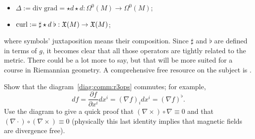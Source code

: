 \begin{example}
\begin{itemize}
		\item $\Delta := \mathrm{div}\; \mathrm{grad} = \star d \star d : \Omega^0(M) \to \Omega^0(M)$;
		\item $\mathrm{curl} := \sharp \star d\; \flat : \mathfrak{X}(M) \to \mathfrak{X}(M)$;
	\end{itemize}
	where symbols' juxtaposition means their composition.
	Since $\sharp$ and $\flat$ are defined in terms of $g$, it becomes clear that all those operators are tightly related to the metric.
	There could be a lot more to say, but that will be more suited for a course in Riemannian geometry.
	A comprehensive free resource on the subject is \cite{book:derivations}.
\end{example}

\begin{exercise}
	Show that the diagram~\eqref{diag:comm:r3ops} commutes; for example,
	\begin{equation}
		df = \frac{\partial f}{\partial x^i} dx^i = (\nabla f)_i dx^i = (\nabla f)^\flat.
	\end{equation}
	Use the diagram to give a quick proof that $(\nabla\times)\circ \nabla \equiv 0$ and that $(\nabla\cdot) \circ (\nabla\times) \equiv 0$ (physically this last identity implies that magnetic fields are divergence free).
\end{exercise}

